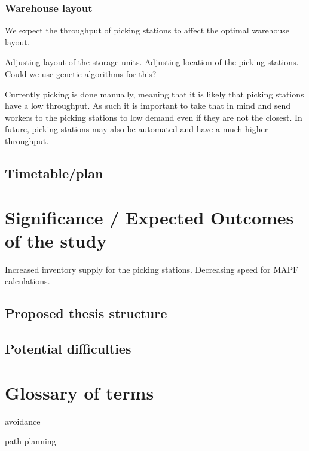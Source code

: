 \documentclass[a4paper,11pt]{article}
\begin{document}
\subsubsection{Warehouse layout}
We expect the throughput of picking stations to affect the optimal warehouse layout.

Adjusting layout of the storage units. 
Adjusting location of the picking stations.
Could we use genetic algorithms for this?


Currently picking is done manually, meaning that it is likely that picking stations have a low throughput. As such it is important to take that in mind and send workers to the picking stations to low demand even if they are not the closest. In future, picking stations may also be automated and have a much higher throughput. 


\subsection{Timetable/plan}


\section{Significance / Expected Outcomes of the study}
Increased inventory supply for the picking stations. Decreasing speed for MAPF calculations.

\subsection{Proposed thesis structure}


\subsection{Potential difficulties}


\section{Glossary of terms}

avoidance

path planning



\end{document}
